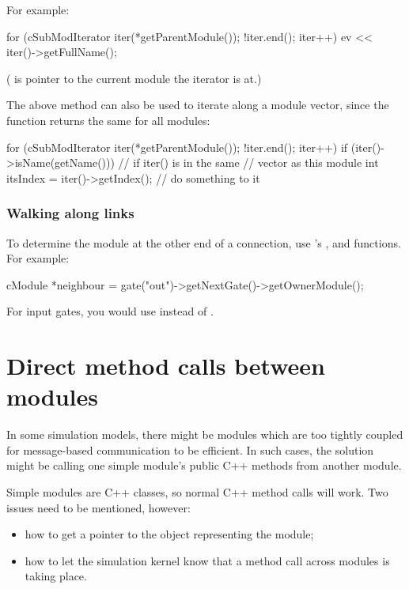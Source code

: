 For example:

\begin{cpp}
for (cSubModIterator iter(*getParentModule()); !iter.end(); iter++)
{
  ev << iter()->getFullName();
}
\end{cpp}

( is pointer to the current module the iterator is at.)


The above method can also be used to iterate along a module
vector, since the 
function returns the same for all modules:

\begin{cpp}
for (cSubModIterator iter(*getParentModule()); !iter.end(); iter++)
{
  if (iter()->isName(getName())) // if iter() is in the same
                              // vector as this module
  {
    int itsIndex = iter()->getIndex();
    // do something to it
  }
}
\end{cpp}


\subsubsection{Walking along links}

To determine the module at the other end of a connection, use
's ,  and
 functions. For example:

\begin{cpp}
cModule *neighbour = gate("out")->getNextGate()->getOwnerModule();
\end{cpp}

For input gates, you would use  instead of
.


\section{Direct method calls between modules}
\label{sec:simple-modules:direct-method-calls}

In some simulation models, there might be modules which are too
tightly coupled for message-based communication to be efficient.
In such cases, the solution might be calling one simple module's public
C++ methods from another module.

Simple modules are C++ classes, so normal C++ method calls will
work. Two issues need to be mentioned, however:

\begin{itemize}
  \item how to get a pointer to the object representing the module;
  \item how to let the simulation kernel know that a method call across modules
     is taking place.
\end{itemize}

